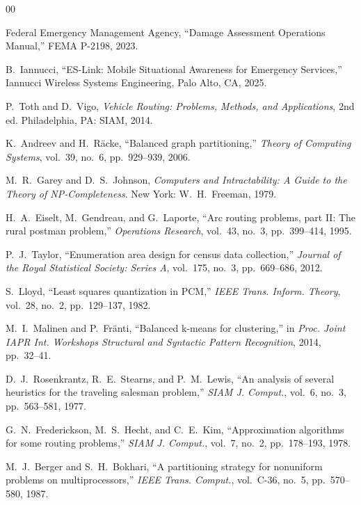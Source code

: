 \documentclass[conference]{IEEEtran}
\begin{document}
\begin{thebibliography}{00}

Federal Emergency Management Agency, ``Damage Assessment Operations Manual,'' FEMA P-2198, 2023.

B.~Iannucci, ``ES-Link: Mobile Situational Awareness for Emergency Services,'' Iannucci Wireless Systems Engineering, Palo Alto, CA, 2025.

P.~Toth and D.~Vigo, \emph{Vehicle Routing: Problems, Methods, and Applications}, 2nd ed. Philadelphia, PA: SIAM, 2014.

K.~Andreev and H.~R\"acke, ``Balanced graph partitioning,'' \emph{Theory of Computing Systems}, vol.~39, no.~6, pp.~929--939, 2006.

M.~R.~Garey and D.~S.~Johnson, \emph{Computers and Intractability: A Guide to the Theory of NP-Completeness}. New York: W.~H.~Freeman, 1979.

H.~A.~Eiselt, M.~Gendreau, and G.~Laporte, ``Arc routing problems, part II: The rural postman problem,'' \emph{Operations Research}, vol.~43, no.~3, pp.~399--414, 1995.

P.~J.~Taylor, ``Enumeration area design for census data collection,'' \emph{Journal of the Royal Statistical Society: Series A}, vol.~175, no.~3, pp.~669--686, 2012.

S.~Lloyd, ``Least squares quantization in PCM,'' \emph{IEEE Trans. Inform. Theory}, vol.~28, no.~2, pp.~129--137, 1982.

M.~I.~Malinen and P.~Fr\"anti, ``Balanced k-means for clustering,'' in \emph{Proc. Joint IAPR Int. Workshops Structural and Syntactic Pattern Recognition}, 2014, pp.~32--41.

D.~J.~Rosenkrantz, R.~E.~Stearns, and P.~M.~Lewis, ``An analysis of several heuristics for the traveling salesman problem,'' \emph{SIAM J. Comput.}, vol.~6, no.~3, pp.~563--581, 1977.

G.~N.~Frederickson, M.~S.~Hecht, and C.~E.~Kim, ``Approximation algorithms for some routing problems,'' \emph{SIAM J. Comput.}, vol.~7, no.~2, pp.~178--193, 1978.

M.~J.~Berger and S.~H.~Bokhari, ``A partitioning strategy for nonuniform problems on multiprocessors,'' \emph{IEEE Trans. Comput.}, vol.~C-36, no.~5, pp.~570--580, 1987.


\end{thebibliography}
\end{document}

